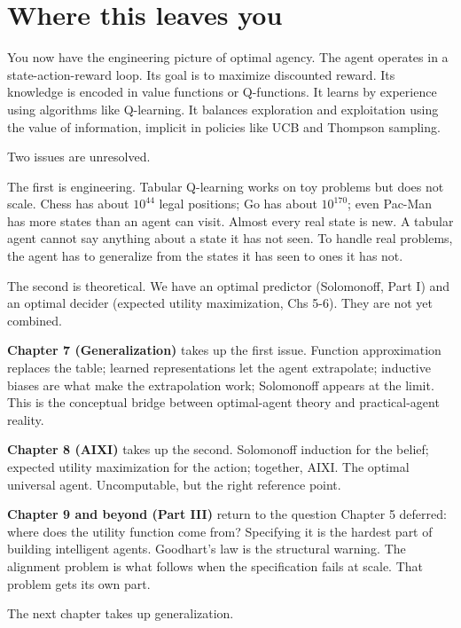\section*{Where this leaves you}

You now have the engineering picture of optimal agency. The agent operates in a state-action-reward loop. Its goal is to maximize discounted reward. Its knowledge is encoded in value functions or Q-functions. It learns by experience using algorithms like Q-learning. It balances exploration and exploitation using the value of information, implicit in policies like UCB and Thompson sampling.

Two issues are unresolved.

The first is engineering. Tabular Q-learning works on toy problems but does not scale. Chess has about $10^{44}$ legal positions; Go has about $10^{170}$; even Pac-Man has more states than an agent can visit. Almost every real state is new. A tabular agent cannot say anything about a state it has not seen. To handle real problems, the agent has to generalize from the states it has seen to ones it has not.

The second is theoretical. We have an optimal predictor (Solomonoff, Part I) and an optimal decider (expected utility maximization, Chs 5-6). They are not yet combined.

\textbf{Chapter 7 (Generalization)} takes up the first issue. Function approximation replaces the table; learned representations let the agent extrapolate; inductive biases are what make the extrapolation work; Solomonoff appears at the limit. This is the conceptual bridge between optimal-agent theory and practical-agent reality.

\textbf{Chapter 8 (AIXI)} takes up the second. Solomonoff induction for the belief; expected utility maximization for the action; together, AIXI. The optimal universal agent. Uncomputable, but the right reference point.

\textbf{Chapter 9 and beyond (Part III)} return to the question Chapter 5 deferred: where does the utility function come from? Specifying it is the hardest part of building intelligent agents. Goodhart's law is the structural warning. The alignment problem is what follows when the specification fails at scale. That problem gets its own part.

The next chapter takes up generalization.
